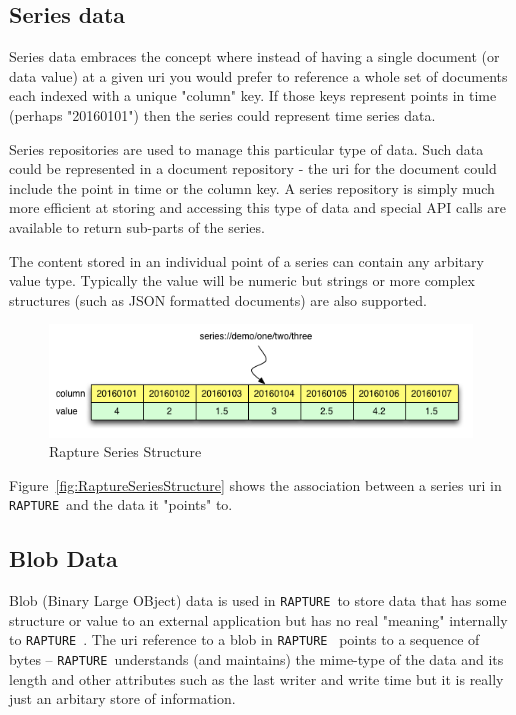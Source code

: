 \documentclass[12pt,twoside,a4paper]{book}
\newcommand{\Rapture}{\Verb+RAPTURE+~}
\begin{document}
\subsection{Series data}

Series data embraces the concept where instead of having a single document (or data value) at a given
uri you would prefer to reference a whole set of documents each indexed with a unique "column" key. If those
keys represent points in time (perhaps "20160101") then the series could represent time series data.

Series repositories are used to manage this particular type of data. Such data could be represented in a document
repository - the uri for the document could include the point in time or the column key. A series repository is simply
much more efficient at storing and accessing this type of data and special API calls are available to return sub-parts of
the series.

The content stored in an individual point of a series can contain any arbitary value type. Typically the value will be
numeric but strings or more complex structures (such as JSON formatted documents) are also supported.

\begin{figure}[htb]
\centering
\includegraphics[scale=0.7]{Graphics/SeriesExplain}
\caption{Rapture Series Structure}
\label{fig:RaptureSeriesStructure}
\end{figure}

Figure~\vref{fig:RaptureSeriesStructure} shows the association between a series uri in \Rapture and the data
it "points" to.

\subsection{Blob Data}

Blob (Binary Large OBject) data is used in \Rapture to store data that has some structure or value to an
external application but has no real "meaning" internally to \Rapture. The uri reference to a blob in \Rapture
points to a sequence of bytes -- \Rapture understands (and maintains) the mime-type of the data and its length
and other attributes such as the last writer and write time but it is really just an arbitary store of information.
\end{document}
